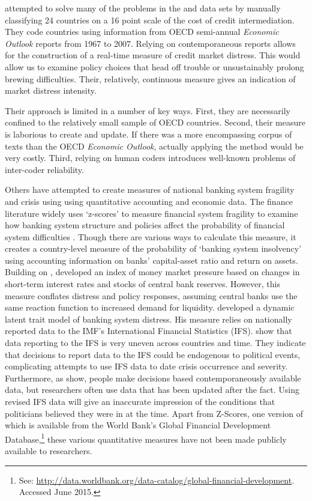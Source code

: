 \documentclass[]{article}
\begin{document}
\cite{Romer2015} attempted to solve many of the problems in the \cite{Reinhart2009} and \cite{laeven2013} data sets by manually
classifying 24 countries on a 16 point scale of the cost of
credit intermediation. They code countries using information from OECD
semi-annual \emph{Economic Outlook} reports from 1967 to 2007. Relying
on contemporaneous reports allows for the construction of a real-time
measure of credit market distress. This would allow us to examine policy
choices that head off trouble or unsustainably prolong brewing
difficulties. Their, relatively, continuous measure gives an indication
of market distress intensity.

Their approach is limited in a number of key ways. First, they
are necessarily confined to the relatively small sample of OECD
countries. Second, their measure is laborious to create and update. If there was a more encompassing corpus of texts than the OECD \emph{Economic Outlook}, actually applying the method would be very costly. Third, relying on human coders introduces well-known problems of inter-coder reliability.

Others have attempted to create measures of national banking system fragility and crisis using using quantitative accounting and economic data. The finance literature widely uses `z-scores' to measure financial system fragility to examine how banking system structure and policies affect the probability of financial system difficulties \citep[73]{Lepetit2013}. Though there are various ways to calculate this measure, it creates a country-level measure of the probability of `banking system insolvency' using accounting information on banks' capital-asset ratio and return on assets. Building on \cite{vonHagen2007}, \cite{Jing2015} developed an index of money market pressure based on changes in short-term interest rates and stocks of central bank reserves. However, this measure conflates distress and policy responses,
assuming central banks use the same reaction function to increased
demand for liquidity. \cite{Rosas2009} developed a dynamic latent trait
model of banking system distress. His measure relies on nationally reported data to the IMF's International Financial Statistics (IFS). \cite{GandrudCopHal2015} show that data reporting to the IFS is very uneven across countries and time. They indicate that decisions to report data to the IFS could be endogenous to political events, complicating attempts to use IFS data to date crisis occurrence and severity. Furthermore, as \cite{KayserLeininger2015} show, people make decisions based contemporaneously available data, but researchers often use data that has been updated after the fact. Using revised IFS data will give an inaccurate impression of the conditions that politicians believed they were in at the time. Apart from Z-Scores, one version of which is available from the World Bank's Global Financial Development Database,\footnote{See: \url{http://data.worldbank.org/data-catalog/global-financial-development}. Accessed June 2015.} these various quantitative measures have not been made publicly available to researchers.
\end{document}
